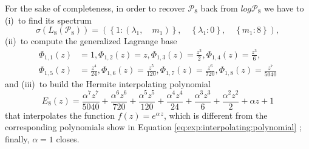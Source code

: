 \begin{example}
For the sake of completeness, in order to recover $\mathcal{P}_{8}$ back from
$log{\mathcal{P}_{8}}$ we have to (i)~to find its spectrum
\begin{displaymath}
\sigma{\left ({L_{ 8 }}{\left (\mathcal{P}_{ 8 } \right )} \right )} = \left ( \left \{ 1 : \left ( \lambda_{1}, \quad m_{1}\right )\right \}, \quad \left \{ \lambda_{1} : 0\right \}, \quad \left \{ m_{1} : 8\right \}\right ),
\end{displaymath}
(ii)~to compute the generalized Lagrange base
\begin{displaymath}
\begin{split}
\Phi_{ 1, 1 }{\left (z \right )} &= 1, \Phi_{ 1, 2 }{\left (z \right )} = z, \Phi_{ 1, 3 }{\left (z \right )} = \frac{z^{2}}{2}, \Phi_{ 1, 4 }{\left (z \right )} = \frac{z^{3}}{6},\\
\Phi_{ 1, 5 }{\left (z \right )} &= \frac{z^{4}}{24}, \Phi_{ 1, 6 }{\left (z \right )} = \frac{z^{5}}{120}, \Phi_{ 1, 7 }{\left (z \right )} = \frac{z^{6}}{720}, \Phi_{ 1, 8 }{\left (z \right )} = \frac{z^{7}}{5040}
\end{split}
\end{displaymath}
and (iii)~to build the Hermite interpolating polynomial
\begin{displaymath}
{E_{ 8 }}{\left (z \right )} = \frac{\alpha^{7} z^{7}}{5040} + \frac{\alpha^{6} z^{6}}{720} + \frac{\alpha^{5} z^{5}}{120} + \frac{\alpha^{4} z^{4}}{24} + \frac{\alpha^{3} z^{3}}{6} + \frac{\alpha^{2} z^{2}}{2} + \alpha z + 1
\end{displaymath}
that interpolates the function $f(z)=e^{\alpha\,z}$, which is different from
the corresponding polynomials show in Equation
\ref{eq:exp:interpolating:polynomial} ; finally, $\alpha=1$ closes.
\end{example}
